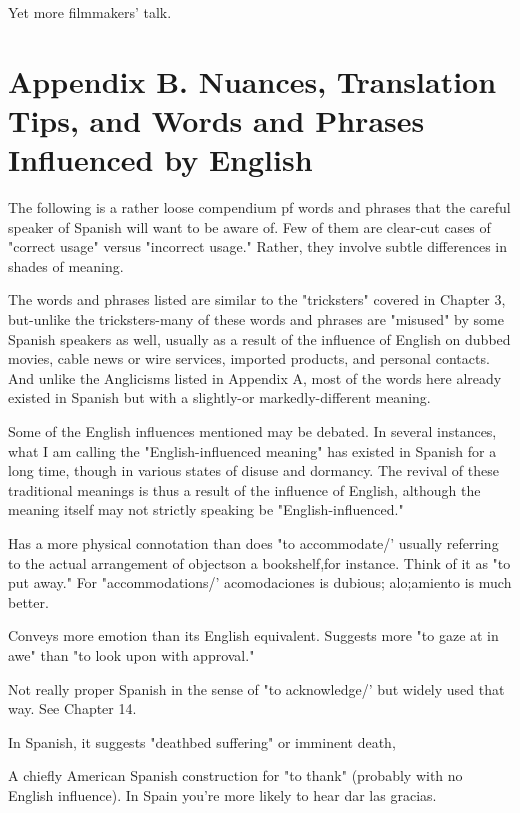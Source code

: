  Yet more filmmakers' talk.

\chapter{Appendix B. Nuances, Translation Tips, and Words and Phrases Influenced by English}

The following is a rather loose compendium pf words and
phrases that the careful speaker of Spanish will want to be aware of.
Few of them are clear-cut cases of "correct usage" versus "incorrect usage." Rather, they involve subtle differences in shades of meaning.

The words and phrases listed are similar to the "tricksters"
covered in Chapter 3, but-unlike the tricksters-many of these words
and phrases are "misused" by some Spanish speakers as well, usually
as a result of the influence of English on dubbed movies, cable news
or wire services, imported products, and personal contacts. And unlike the Anglicisms listed in Appendix A, most of the words here already
existed in Spanish but with a slightly-or markedly-different meaning.

Some of the English influences mentioned may be debated. In
several instances, what I am calling the "English-influenced meaning"
has existed in Spanish for a long time, though in various states of disuse and dormancy. The revival of these traditional meanings is thus a
result of the influence of English, although the meaning itself may not
strictly speaking be "English-influenced."

\bsk

 Has a more physical connotation than does "to
accommodate/' usually referring to the actual arrangement of objectson a bookshelf,for instance. Think of it as "to put away." For "accommodations/' acomodaciones is dubious; alo;amiento is much better.

 Conveys more emotion than its English equivalent.
Suggests more "to gaze at in awe" than "to look upon with approval."

 Not really proper Spanish in the sense of "to acknowledge/' but widely used that way. See Chapter 14.

 In Spanish, it suggests "deathbed suffering" or imminent death,

 A chiefly American Spanish construction for
"to thank" (probably with no English influence). In Spain you're more
likely to hear dar las gracias.

